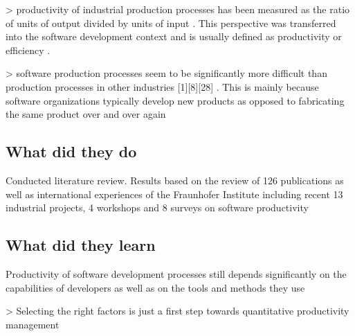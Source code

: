 > productivity of industrial production processes has been measured as the ratio of units of output divided by units of input \cite{morisioFrameworkBasedSoftware1999}. This perspective was transferred into the software development context and is usually defined as productivity \cite{teasleyRapidSoftwareDevelopment2002} or efficiency \cite{herron2005identifying}.

> software production processes seem to be significantly more difficult than production processes in other industries [1][8][28] \cite{abdel-hamidSlipperyPathProductivity1996,briand2002software,kemererEmpiricalValidationSoftware1987}. This is mainly because software organizations typically develop new products as opposed to fabricating the same product over and over again %

\subsection{What did they do}

Conducted literature review. Results based on the review of 126 publications as well as international experiences of the Fraunhofer Institute including recent 13 industrial projects, 4 workshops and 8 surveys on software productivity

\subsection{What did they learn}

Productivity of software development processes still depends significantly on the capabilities of developers as well as on the tools and methods they use

> Selecting the right factors is just a first step towards quantitative productivity management
